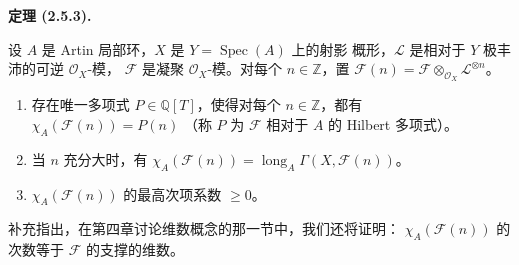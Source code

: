 \documentclass[UTF8,fontset=none,11pt,oneside,openany]{ctexbook}
\newenvironment{theorem}[1][]{%
  \par\medskip\noindent\textbf{定理 (#1).}\ %
}{\par}
\let\EGAOriginalLabel\label
\renewcommand{\label}[1]{\phantomsection\EGAOriginalLabel{#1}}
\begin{document}
\begin{theorem}[2.5.3]
\label{III.2.5.3-fr}
设 $A$ 是 Artin 局部环，$X$ 是 $Y=\operatorname{Spec}(A)$ 上的射影
概形，$\mathcal L$ 是相对于 $Y$ 极丰沛的可逆 $\mathcal O_X$-模，
$\mathcal F$ 是凝聚 $\mathcal O_X$-模。对每个 $n\in\mathbb Z$，置
$\mathcal F(n)=\mathcal F\otimes_{\mathcal O_X}\mathcal L^{\otimes n}$。
\begin{enumerate}
\item[(i)] 存在唯一多项式 $P\in\mathbb Q[T]$，使得对每个
$n\in\mathbb Z$，都有 $\chi_A(\mathcal F(n))=P(n)$
（称 $P$ 为 $\mathcal F$ 相对于 $A$ 的 Hilbert 多项式）。
\item[(ii)] 当 $n$ 充分大时，有
$\chi_A(\mathcal F(n))=\operatorname{long}_A
\Gamma(X,\mathcal F(n))$。
\item[(iii)] $\chi_A(\mathcal F(n))$ 的最高次项系数 $\geq0$。
\end{enumerate}
\end{theorem}

补充指出，在第四章讨论维数概念的那一节中，我们还将证明：
$\chi_A(\mathcal F(n))$ 的次数等于 $\mathcal F$ 的支撑的维数。
\end{document}
